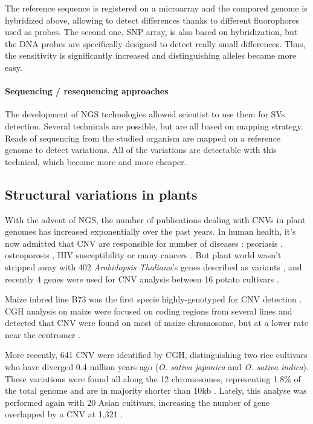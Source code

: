 \documentclass[a4paper, 12pt]{article}
\begin{document}
\begin{onehalfspace}
The reference sequence is registered on a microarray and the compared genome is hybridized above, allowing to detect differences thanks to different fluorophores used as probes. The second one, SNP array, is also based on hybridization, but the DNA probes are specifically designed to detect really small differences. Thus, the sensitivity is significantly increased and  distinguishing alleles became more easy.

                    \paragraph{Sequencing / resequencing approaches}

The development of NGS technologies allowed scientist to use them for SVs detection. Several technicals are possible, but are all based on mapping strategy. Reads of sequencing from the studied organism are mapped on a reference genome to detect variations. All of the variations are detectable with this technical, which become more and more cheaper.

        \subsection{Structural variations in plants}

With the advent of NGS, the number of publications dealing with CNVs in plant genomes has increased exponentially over the past years. In human health, it's now admitted that CNV are responsible for number of diseases : psoriasis \citep{Hollox2008}, osteoporosis \citep{Yang2008}, HIV susceptibility \citep{Gonzalez2005} or many cancers \citep{Stadler2012}. But plant world wasn't stripped away with 402 \textit{Arabidopsis Thaliana}'s genes described as variants \citep{DeBolt2010}, and recently 4 genes were used for CNV analysis between 16 potato cultivars \citep{Iovene2013}.

Maize inbred line B73 was the first specie highly-genotyped for CNV detection \citep{Springer2009}. CGH analysis on maize were focused on coding regions from several lines and detected that CNV were found on most of maize chromosome, but at a lower rate near the centromer \citep{Belo2010}.

More recently, 641 CNV were identified by CGH, distinguishing two rice cultivars who have diverged 0.4 million years ago (\textit{O. sativa japonica} and \textit{O. sativa indica}). These variations were found all along the 12 chromosomes, representing 1.8\% of the total genome and are in majority shorter than 10kb \citep{Yu2011}. Lately, this analyse was performed again with 20 Asian cultivars, increasing the number of gene overlapped by a CNV at 1,321 \citep{Yu2013}.


\end{onehalfspace}
\end{document}
